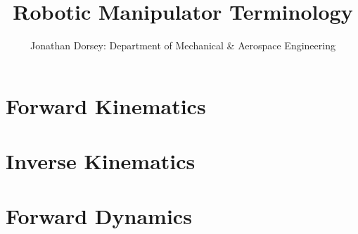 \documentclass[12px]{article}
\begin{document}
    \title{Robotic Manipulator Terminology }

    \author{Jonathan Dorsey: Department of Mechanical \& Aerospace Engineering}

    \maketitle


    \section{Forward Kinematics}

    \section{Inverse Kinematics}

    \section{Forward Dynamics}
    
\end{document}
